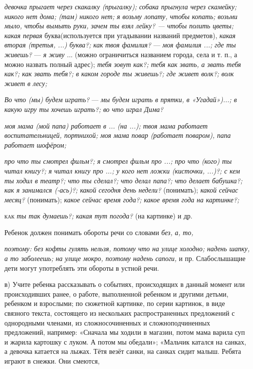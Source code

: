 \documentclass{book}
\renewcommand{\emph}[1]{\textit{#1}}
\begin{document}
\emph{девочка прыгает через скакалку (прыгалку); собака прыгнула через
скамейку; никого нет дома; (там) никого нет; я возьму лопату, чтобы
копать; возьми мыло, чтобы вымыть руки, зачем ты взял лейку? --- чтобы
полить цветы; какая первая} буква(используется при угадывании названий
предметов), \emph{какая вторая (третья, ...) буква?; как} \emph{твоя
фамилия?} --- \emph{моя фамилия ...; где ты живешь?} --- \emph{я живу}
... (можно ограничиться названием города, села и т. п., а можно назвать
полный адрес); \emph{тебя зовут как?; тебя как звать, а звать тебя как?;
как звать тебя?; в каком городе ты живешь?; где живет волк?; волк живет
в лесу;}

\emph{Во что (мы) будем играть?} --- \emph{мы будем играть в прятки, в
«Угадай»)...; в какую игру ты хочешь играть?; во что играл Дима?}

\emph{моя мама (мой папа) работает в ... (на ...); твоя мама работает
воспитательницей, портнихой; моя мама повар (работает поваром), папа
работает шофёром;}

\emph{про что ты смотрел фильм?; я смотрел фильм про ...; про что (кого)
ты читал книгу?; я читал книгу про ...; у кого нет ложки (кисточки,
...)?; с кем ты ходил в театр?; что ты сделал?; что делал папа?; что
делает бабушка?; как я занимался (-ась)?; какой сегодня день недели?}
(понимать); \emph{какой сейчас месяц?} (понимать); \emph{какое сейчас
время года?; какое время года на картинке?;}

\textsc{как} \emph{ты так думаешь?; какая тут погода?} (на картинке) и
др.

Ребенок должен понимать обороты речи со словами \emph{без, а, то,}

\emph{поэтому: без кофты гулять нельзя, потому что на улице холодно;
надень шапку, а то заболеешь; на улице мокро, поэтому надень сапоги,} и
пр. Слабослышащие дети могут употреблять эти обороты в устной речи.

в) Учите ребенка рассказывать о событиях, происходящих в данный момент
или происходивших ранее, о работе, выполненной ребенком и другими
детьми, ребенком и взрослыми; по сюжетной картинке, по серии картинок, в
виде связного текста, состоящего из нескольких распространенных
предложений с однородными членами, из сложносочиненных и
сложноподчиненных предложений, например: «Сначала мы ходили в магазин,
потом мама варила суп и жарила картошку с луком. А потом мы обедали»;
«Мальчик катался на санках, а девочка катается на лыжах. Тётя везёт
санки, на санках сидит малыш. Ребята играют в снежки. Они смеются,
\end{document}
